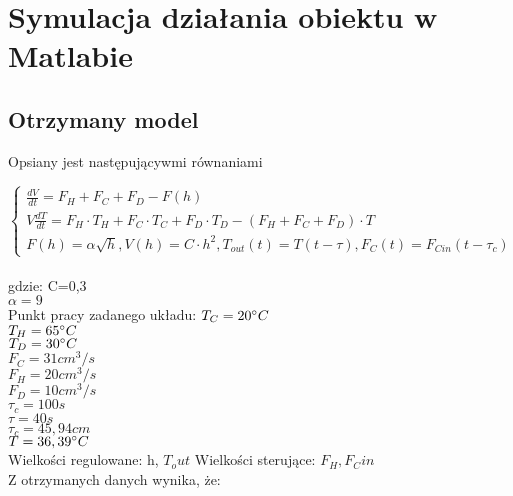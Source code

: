 \section{Symulacja działania obiektu w Matlabie}

\subsection{Otrzymany model}
Opsiany jest następującywmi równaniami

  \[  \left\{ \begin{array}{ll}
 \frac{dV}{dt}=F_H + F_C + F_D - F(h)\\
V\frac{dT}{dt}=F_H \cdot T_H + F_C \cdot T_C + F_D \cdot T_D -(F_H + F_C + F_D)\cdot T\\
F(h)=\alpha \sqrt{h}, V(h)=C\cdot h^2, T_{out}(t)=T(t-\tau), F_C(t)=F_{Cin}(t-\tau_c)
\end{array} \right. \]
\\
gdzie:
\newline
C=0,3\\
\(\alpha=9\)\\
\newline Punkt pracy zadanego układu:
\(T_C=20\degree C\)\\
\(T_H=65\degree C\)\\
\(T_D=30\degree C\)\\
\(F_C=31cm^3/s\)\\
\(F_H=20cm^3/s\)\\
\(F_D=10cm^3/s\)\\
\(\tau_c=100 s\)\\
\(\tau=40 s\)\\
\(\tau_c=45,94 cm\)\\
\(T=36,39\degree C\)\\
\newline Wielkości regulowane: h, \(T_out\)
\newline Wielkości sterujące: \(F_H, F_Cin\)\\
\newline Z otrzymanych danych wynika, że:\\

